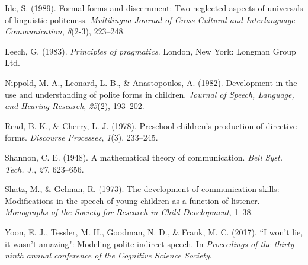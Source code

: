 \documentclass[10pt, letterpaper]{article}
\begin{document}
\hypertarget{ref-ide1989}{}
Ide, S. (1989). Formal forms and discernment: Two neglected aspects of
universals of linguistic politeness. \emph{Multilingua-Journal of
Cross-Cultural and Interlanguage Communication}, \emph{8}(2-3),
223--248.

\hypertarget{ref-leech1983}{}
Leech, G. (1983). \emph{Principles of pragmatics}. London, New York:
Longman Group Ltd.

\hypertarget{ref-nippold1982}{}
Nippold, M. A., Leonard, L. B., \& Anastopoulos, A. (1982). Development
in the use and understanding of polite forms in children. \emph{Journal
of Speech, Language, and Hearing Research}, \emph{25}(2), 193--202.

\hypertarget{ref-read1978}{}
Read, B. K., \& Cherry, L. J. (1978). Preschool children's production of
directive forms. \emph{Discourse Processes}, \emph{1}(3), 233--245.

\hypertarget{ref-shannon1948}{}
Shannon, C. E. (1948). A mathematical theory of communication.
\emph{Bell Syst. Tech. J.}, \emph{27}, 623--656.

\hypertarget{ref-shatz1973}{}
Shatz, M., \& Gelman, R. (1973). The development of communication
skills: Modifications in the speech of young children as a function of
listener. \emph{Monographs of the Society for Research in Child
Development}, 1--38.

\hypertarget{ref-yoon2017}{}
Yoon, E. J., Tessler, M. H., Goodman, N. D., \& Frank, M. C. (2017). ``I
won't lie, it wasn't amazing": Modeling polite indirect speech. In
\emph{Proceedings of the thirty-ninth annual conference of the Cognitive
Science Society}.


\end{document}
